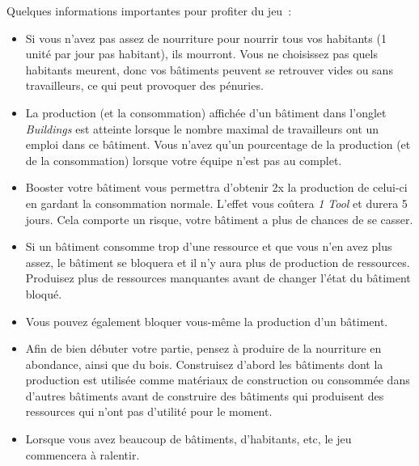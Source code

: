 \documentclass{article}
\begin{document}
Quelques informations importantes pour profiter du jeu :
\begin{itemize}
\item Si vous n'avez pas assez de nourriture pour nourrir tous vos habitants (1 unité par jour pas habitant),
ils mourront. Vous ne choisissez pas quels habitants meurent, donc vos bâtiments peuvent se retrouver vides ou sans travailleurs, ce qui peut provoquer des pénuries.
\item La production (et la consommation) affichée d'un bâtiment dans l'onglet \textit{Buildings} est atteinte lorsque le nombre maximal de
travailleurs ont un emploi dans ce bâtiment. Vous n'avez qu'un pourcentage de la production (et de la consommation) lorsque votre équipe n'est pas au complet.
\item Booster votre bâtiment vous permettra d'obtenir 2x la production de celui-ci en gardant la consommation normale. L'effet vous coûtera
\textit{1 Tool} et durera 5 jours. Cela comporte un risque, votre bâtiment a plus de chances de se casser.
\item Si un bâtiment consomme trop d'une ressource et que vous n'en avez plus assez, le bâtiment se bloquera et il n'y aura
plus de production de ressources. Produisez plus de ressources manquantes avant de changer l'état du bâtiment bloqué.
\item Vous pouvez également bloquer vous-même la production d'un bâtiment.
\item Afin de bien débuter votre partie, pensez à produire de la nourriture en abondance, ainsi que du bois. Construisez d'abord les bâtiments dont la production est utilisée
comme matériaux de construction ou consommée dans d'autres bâtiments avant de construire des bâtiments qui produisent des ressources qui n'ont pas d'utilité pour le moment.
\item Lorsque vous avez beaucoup de bâtiments, d'habitants, etc, le jeu commencera à ralentir.
\end{itemize}
\end{document}
